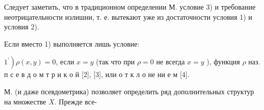 \documentclass[10pt]{article}
\begin{document}
Следует заметить, что в традиционном определении М. условие 3) и требование неотрицательности излишни, т. е. вытекают уже из достаточности условия 1) и условия 2).



Если вместо 1) выполняется лишь условие:



$\left.1^{\prime}\right) \rho(x, y)=0$, если $x=y$ (так что при $\rho=0$ не всегда $x=y$ ), функция $\rho$ наз. п с е в д о м т р и к о й [2], [3], или о т к л о не ни е м [4].



М. (и даже псевдометрика) позволяет определить ряд дополнительных структур на множестве $X$. Прежде все-
\end{document}

